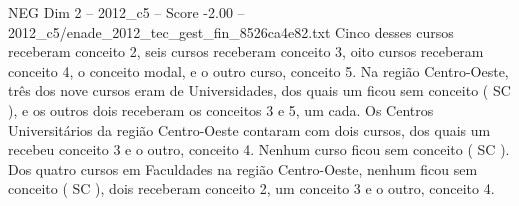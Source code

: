 \begin{textsample}{NEG Dim 2 – 2012\_c5 – Score -2.00 – 2012\_c5/enade\_2012\_tec\_gest\_fin\_8526ca4e82.txt}
Cinco desses cursos receberam conceito 2, seis cursos receberam conceito 3, oito cursos receberam conceito 4, o conceito modal, e o outro curso, conceito 5.
Na região Centro-Oeste, três dos nove cursos eram de Universidades, dos quais um ficou sem conceito ( SC ), e os outros dois receberam os conceitos 3 e 5, um cada.
Os Centros Universitários da região Centro-Oeste contaram com dois cursos, dos quais um recebeu conceito 3 e o outro, conceito 4.
Nenhum curso ficou sem conceito ( SC ).
Dos quatro cursos em Faculdades na região Centro-Oeste, nenhum ficou sem conceito ( SC ), dois receberam conceito 2, um conceito 3 e o outro, conceito 4.

\end{textsample}
